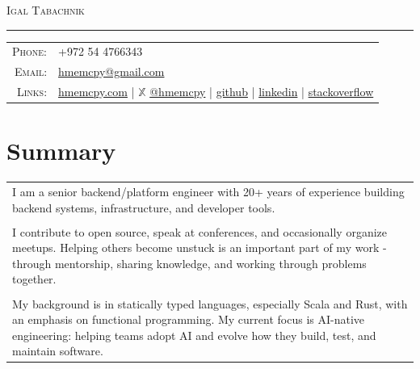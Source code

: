 \documentclass[a4paper,11pt]{article}
\begin{document}
\par{\centering
		{\Huge \textsc{Igal Tabachnik}
	}\bigskip\par}

\hrule
\vspace{0.5em}
\begin{tabular}{rl}
  \textsc{Phone:}     & +972 54 4766343\\
  \textsc{Email:}     & \href{mailto:hmemcpy@gmail.com}{hmemcpy@gmail.com}\\
  \textsc{Links:}     & \faHome{} \href{https://hmemcpy.com}{hmemcpy.com}
                      | $\mathbb{X}$ \href{https://x.com/hmemcpy}{@hmemcpy}
                      | \faGithub{} \href{https://github.com/hmemcpy}{github}
                      | \faLinkedin{} \href{https://www.linkedin.com/in/igaltabachnik/}{linkedin}
                      | \faStackOverflow{} \href{https://stackoverflow.com/users/8205/igal-tabachnik}{stackoverflow}
\end{tabular}

\section{Summary}
\begin{tabular}{p{}}
 I am a senior backend/platform engineer with 20+ years of experience building backend systems, infrastructure, and developer tools.\\\\

 I contribute to open source, speak at conferences, and occasionally organize meetups. Helping others become unstuck is an important part of my work - through mentorship, sharing knowledge, and working through problems together.\\\\

 My background is in statically typed languages, especially Scala and Rust, with an emphasis on functional programming. My current focus is AI-native engineering: helping teams adopt AI and evolve how they build, test, and maintain software.
\end{tabular}
\end{document}
